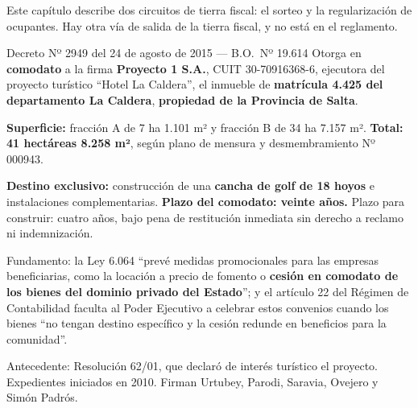 Este capítulo describe dos circuitos de tierra fiscal: el sorteo y la regularización de ocupantes. Hay otra vía de salida de la tierra fiscal, y no está en el reglamento.

\begin{ficha}{Decreto Nº 2949 del 24 de agosto de 2015 --- B.O.\ Nº 19.614}
Otorga en \textbf{comodato} a la firma \textbf{Proyecto 1 S.A.}, CUIT 30-70916368-6, ejecutora del proyecto turístico ``Hotel La Caldera'', el inmueble de \textbf{matrícula 4.425 del departamento La Caldera}, \textbf{propiedad de la Provincia de Salta}.

\textbf{Superficie:} fracción A de 7 ha 1.101 m² y fracción B de 34 ha 7.157 m². \textbf{Total: 41 hectáreas 8.258 m²}, según plano de mensura y desmembramiento Nº 000943.

\textbf{Destino exclusivo:} construcción de una \textbf{cancha de golf de 18 hoyos} e instalaciones complementarias. \textbf{Plazo del comodato: veinte años.} Plazo para construir: cuatro años, bajo pena de restitución inmediata sin derecho a reclamo ni indemnización.

Fundamento: la Ley 6.064 ``prevé medidas promocionales para las empresas beneficiarias, como la locación a precio de fomento o \textbf{cesión en comodato de los bienes del dominio privado del Estado}''; y el artículo 22 del Régimen de Contabilidad faculta al Poder Ejecutivo a celebrar estos convenios cuando los bienes ``no tengan destino específico y la cesión redunde en beneficios para la comunidad''.

Antecedente: Resolución 62/01, que declaró de interés turístico el proyecto. Expedientes iniciados en 2010. Firman Urtubey, Parodi, Saravia, Ovejero y Simón Padrós.
\end{ficha}

